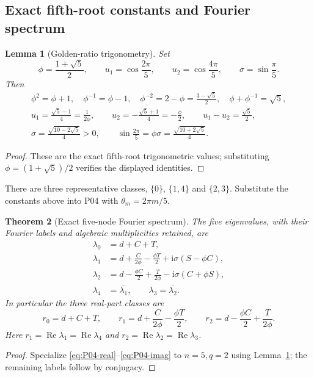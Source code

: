 \documentclass[11pt]{article}
\newcommand{\ii}{\mathrm{i}}
\DeclareMathOperator{\Ree}{Re}
\newtheorem{theorem}{Theorem}[section]
\newtheorem{lemma}[theorem]{Lemma}
\theoremstyle{definition}
\theoremstyle{remark}
\begin{document}
\subsection{Exact fifth-root constants and Fourier spectrum}
\label{slot:P07-1}
\begin{lemma}[Golden-ratio trigonometry]
\label{lem:P07-trig}
Set
\begin{equation}
 \phi=\frac{1+\sqrt5}{2},\qquad
 u_1=\cos\frac{2\pi}{5},\qquad u_2=\cos\frac{4\pi}{5},\qquad
 \sigma=\sin\frac\pi5.
 \label{eq:P07-constants}
\end{equation}
Then
\begin{gather}
 \phi^2=\phi+1,\quad \phi^{-1}=\phi-1,\quad
 \phi^{-2}=2-\phi=\frac{3-\sqrt5}{2},\quad
 \phi+\phi^{-1}=\sqrt5,\label{eq:P07-phi}\\
 u_1=\frac{\sqrt5-1}{4}=\frac1{2\phi},\qquad
 u_2=-\frac{\sqrt5+1}{4}=-\frac\phi2,\qquad
 u_1-u_2=\frac{\sqrt5}{2},\label{eq:P07-cosines}\\
 \sigma=\frac{\sqrt{10-2\sqrt5}}4>0,\qquad
 \sin\frac{2\pi}{5}=\phi\sigma
       =\frac{\sqrt{10+2\sqrt5}}4.\label{eq:P07-sines}
\end{gather}
\end{lemma}
\begin{proof}
These are the exact fifth-root trigonometric values; substituting
$\phi=(1+\sqrt5)/2$ verifies the displayed identities.
\end{proof}


There are three representative classes, $\{0\}$, $\{1,4\}$ and
$\{2,3\}$. Substitute the constants above into P04 with
$\theta_m=2\pi m/5$.

\begin{theorem}[Exact five-node Fourier spectrum]
\label{thm:P07-spectrum}
The five eigenvalues, with their Fourier labels and algebraic
multiplicities retained, are
\begin{align}
 \lambda_0&=d+C+T,\label{eq:P07-spectrum}\\
 \lambda_1&=d+\frac{C}{2\phi}-\frac{\phi T}{2}
                +\ii\sigma(S-\phi C),\nonumber\\
 \lambda_2&=d-\frac{\phi C}{2}+\frac{T}{2\phi}
                -\ii\sigma(C+\phi S),\nonumber\\
 \lambda_4&=\overline{\lambda_1},\qquad
 \lambda_3=\overline{\lambda_2}.\nonumber
\end{align}
In particular the three real-part classes are
\begin{equation}
 r_0=d+C+T,\qquad
 r_1=d+\frac{C}{2\phi}-\frac{\phi T}{2},\qquad
 r_2=d-\frac{\phi C}{2}+\frac{T}{2\phi}.
 \label{eq:P07-real}
\end{equation}
Here $r_1=\Ree\lambda_1=\Ree\lambda_4$ and
$r_2=\Ree\lambda_2=\Ree\lambda_3$.
\end{theorem}
\begin{proof}
Specialize \eqref{eq:P04-real}--\eqref{eq:P04-imag} to $n=5,q=2$
using Lemma~\ref{lem:P07-trig}; the remaining labels follow by conjugacy.
\end{proof}
\end{document}
